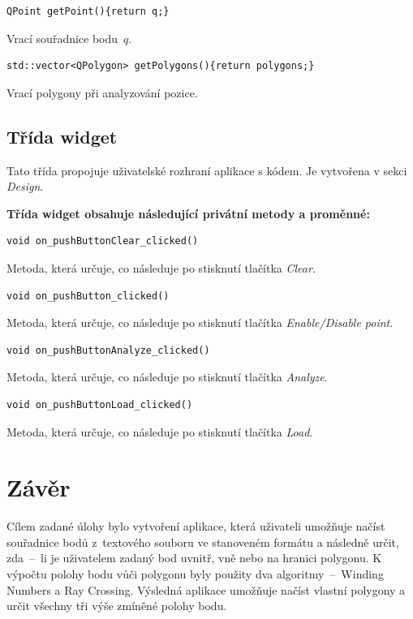 \documentclass[a4paper, 12pt, oneside, titlepage]{article} %
\begin{document}
\begin{verbatim}
QPoint getPoint(){return q;}
\end{verbatim}
Vrací souřadnice bodu~$q$.\\

\begin{verbatim}
std::vector<QPolygon> getPolygons(){return polygons;}
\end{verbatim}
Vrací polygony při analyzování pozice.\\

\subsection*{Třída widget}
Tato třída propojuje uživatelské rozhraní aplikace s kódem. Je vytvořena v sekci \emph{Design}.

\textbf{Třída widget obsahuje následující privátní metody a proměnné:}
\begin{verbatim}
void on_pushButtonClear_clicked()
\end{verbatim}
Metoda, která určuje, co následuje po stisknutí tlačítka \emph{Clear}.\\

\begin{verbatim}
void on_pushButton_clicked()
\end{verbatim}
Metoda, která určuje, co následuje po stisknutí tlačítka \emph{Enable/Disable point}.\\

\begin{verbatim}
void on_pushButtonAnalyze_clicked()
\end{verbatim}
Metoda, která určuje, co následuje po stisknutí tlačítka \emph{Analyze}.\\

\begin{verbatim}
void on_pushButtonLoad_clicked()
\end{verbatim}
Metoda, která určuje, co následuje po stisknutí tlačítka \emph{Load}.\\


\section*{Závěr}
Cílem zadané úlohy bylo vytvoření aplikace, která uživateli umožňuje načíst souřadnice bodů z~textového souboru ve stanoveném formátu a následně určit, zda~--~li je uživatelem zadaný bod uvnitř, vně nebo na hranici polygonu. K výpočtu polohy bodu vůči polygonu byly použity dva algoritmy~--~Winding Numbers a Ray Crossing. Výsledná aplikace umožňuje načíst vlastní polygony a určit všechny tři výše zmíněné polohy bodu.
\end{document}
